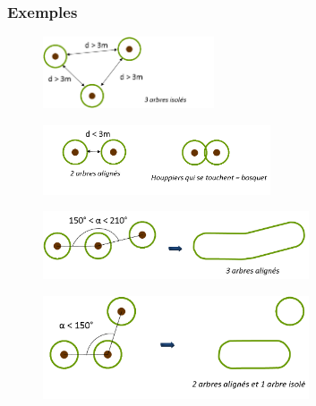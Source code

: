 \documentclass[11pt]{article}
\begin{document}
\subsubsection{Exemples}

\begin{figure}[H]
	\center \includegraphics[width=0.45\textwidth]{img/td_arcpy_da/arbres_isoles.png}\\
\end{figure}

\vspace{2em}

\begin{figure}[H]
	\center \includegraphics[width=0.6\textwidth]{img/td_arcpy_da/arbres_alignes_bosquet.png}\\
\end{figure}

\vspace{2em}

\begin{figure}[H]
	\center \includegraphics[width=0.7\textwidth]{img/td_arcpy_da/arbres_alignes.png}\\
\end{figure}

\vspace{2em}

\begin{figure}[H]
	\center \includegraphics[width=0.7\textwidth]{img/td_arcpy_da/arbres_alignes_isole.png}\\
\end{figure}
\end{document}
